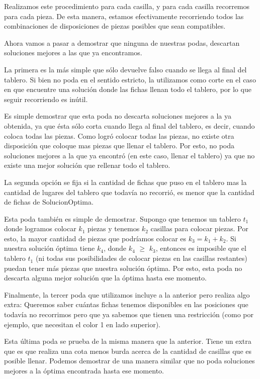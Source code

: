 Realizamos este procedimiento para cada casilla, y para cada casilla recorremos para cada pieza. De esta manera, estamos efectivamente recorriendo todos las combinaciones de disposiciones de piezas posibles que sean compatibles.

Ahora vamos a pasar a demostrar que ninguna de nuestras podas, descartan soluciones mejores a las que ya encontramos.

La primera es la más simple que sólo devuelve falso cuando se llega al final del tablero. Si bien no poda en el sentido estricto, la utilizamos como corte en el caso en que encuentre una solución donde las fichas llenan todo el tablero, por lo que seguir recorriendo es inútil.

Es simple demostrar que esta poda no descarta soluciones mejores a la ya obtenida, ya que ésta sólo corta cuando llega al final del tablero, es decir, cuando coloca todas las piezas. Como logró colocar todas las piezas, no existe otra disposición que coloque mas piezas que llenar el tablero. Por esto, no poda soluciones mejores a la que ya encontró (en este caso, llenar el tablero) ya que no existe una mejor solución que rellenar todo el tablero.

La segunda opción se fija si la cantidad de fichas que puso en el tablero mas la cantidad de lugares del tablero que todavía no recorrió, es menor que la cantidad de fichas de SolucionOptima.

Esta poda también es simple de demostrar. Supongo que tenemos un tablero $t_1$ donde logramos colocar $k_1$ piezas y tenemos $k_2$ casillas para colocar piezas. Por esto, la mayor cantidad de piezas que podríamos colocar es $k_3 = k_1 + k_2$. Si nuestra solución óptima tiene $k_4$, donde $k_4$ $\geq$ $k_3$, entonces es imposible que el tablero $t_1$ (ni todas sus posibilidades de colocar piezas en las casillas restantes) puedan tener más piezas que nuestra solución óptima. Por esto, esta poda no descarta alguna mejor solución que la óptima hasta ese momento.

Finalmente, la tercer poda que utilizamos incluye a la anterior pero realiza algo extra: Queremos saber cuántas fichas tenemos disponibles en las posiciones que todavía no recorrimos pero que ya sabemos que tienen una restricción (como por ejemplo, que necesitan el color 1 en lado superior).

Esta última poda se prueba de la misma manera que la anterior. Tiene un extra que es que realiza una cota menos burda acerca de la cantidad de casillas que es posible llenar. Podemos demostrar de una manera similar que no poda soluciones mejores a la óptima encontrada hasta ese momento.

